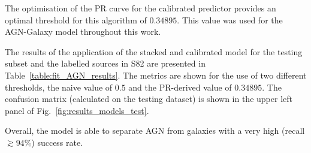 \documentclass{aa}
\begin{document}
The optimisation of the PR curve for the calibrated predictor provides an optimal threshold for this algorithm of $0.34895$. This value was used for the AGN-Galaxy model throughout this work.

The results of the application of the stacked and calibrated model for the testing subset and the labelled sources in S82 are presented in Table~\ref{table:fit_AGN_results}. The metrics are shown for the use of two different thresholds, the naive value of $0.5$ and the  PR-derived value of $0.34895$. The confusion matrix (calculated on the testing dataset) is shown in the upper left panel of Fig.~\ref{fig:results_models_test}. 

Overall, the model is able to separate AGN from galaxies with a very high (recall ${\gtrsim} 94\%$) success rate.
\end{document}
